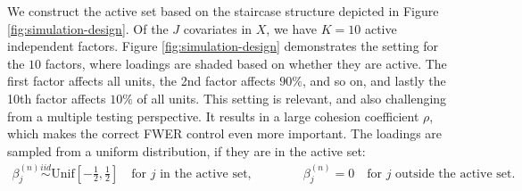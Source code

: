 \documentclass[11pt]{article}
\newcommand{\iid}{\stackrel{iid}{\sim}}
\begin{document}
	
	We construct the active set based on the staircase structure depicted in Figure \ref{fig:simulation-design}. Of the $J$ covariates in $X$, we have $K=10$ active independent factors. Figure \ref{fig:simulation-design} demonstrates the setting for the $10$ factors, where loadings are shaded based on whether they are active. The first factor affects all units, the 2nd factor affects $90\%$, and so on, and lastly the 10th factor affects $10\%$ of all units. This setting is relevant, and also challenging from a multiple testing perspective. It results in a large cohesion coefficient $\rho$, which makes the correct FWER control even more important. The loadings are sampled from a uniform distribution, if they are in the active set:
	\begin{align*}
		\beta_{j}^{(n)}\iid \textrm{Unif} \left[-\frac{1}{2},\frac{1}{2} \right] \quad \text{for $j$ in the active set}, \qquad \qquad \beta_{j}^{(n)}=0 \quad \text{for $j$ outside the active set.}
	\end{align*}
	
\end{document}
